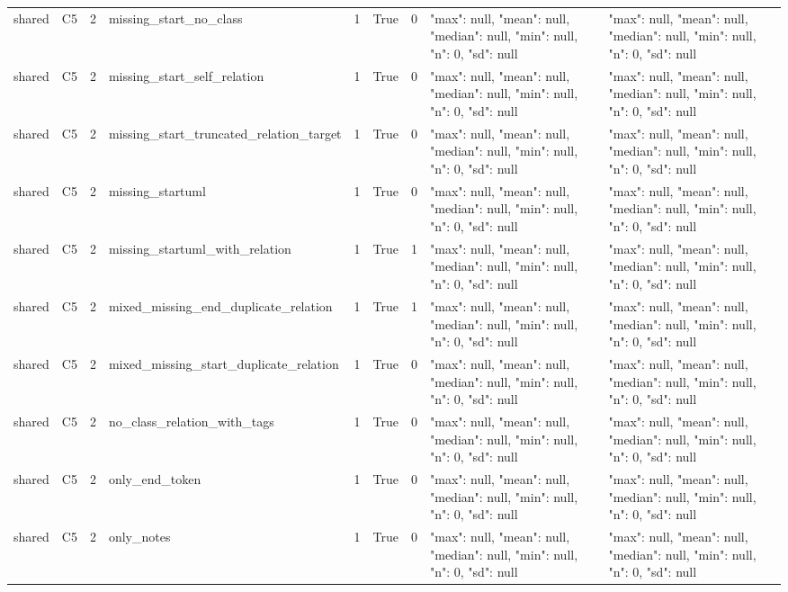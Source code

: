 \begin{tabular}{lllllllll}
shared & C5 & 2 & missing\_start\_no\_class & 1 & True & 0 & {"max": null, "mean": null, "median": null, "min": null, "n": 0, "sd": null} & {"max": null, "mean": null, "median": null, "min": null, "n": 0, "sd": null} \\
shared & C5 & 2 & missing\_start\_self\_relation & 1 & True & 0 & {"max": null, "mean": null, "median": null, "min": null, "n": 0, "sd": null} & {"max": null, "mean": null, "median": null, "min": null, "n": 0, "sd": null} \\
shared & C5 & 2 & missing\_start\_truncated\_relation\_target & 1 & True & 0 & {"max": null, "mean": null, "median": null, "min": null, "n": 0, "sd": null} & {"max": null, "mean": null, "median": null, "min": null, "n": 0, "sd": null} \\
shared & C5 & 2 & missing\_startuml & 1 & True & 0 & {"max": null, "mean": null, "median": null, "min": null, "n": 0, "sd": null} & {"max": null, "mean": null, "median": null, "min": null, "n": 0, "sd": null} \\
shared & C5 & 2 & missing\_startuml\_with\_relation & 1 & True & 1 & {"max": null, "mean": null, "median": null, "min": null, "n": 0, "sd": null} & {"max": null, "mean": null, "median": null, "min": null, "n": 0, "sd": null} \\
shared & C5 & 2 & mixed\_missing\_end\_duplicate\_relation & 1 & True & 1 & {"max": null, "mean": null, "median": null, "min": null, "n": 0, "sd": null} & {"max": null, "mean": null, "median": null, "min": null, "n": 0, "sd": null} \\
shared & C5 & 2 & mixed\_missing\_start\_duplicate\_relation & 1 & True & 0 & {"max": null, "mean": null, "median": null, "min": null, "n": 0, "sd": null} & {"max": null, "mean": null, "median": null, "min": null, "n": 0, "sd": null} \\
shared & C5 & 2 & no\_class\_relation\_with\_tags & 1 & True & 0 & {"max": null, "mean": null, "median": null, "min": null, "n": 0, "sd": null} & {"max": null, "mean": null, "median": null, "min": null, "n": 0, "sd": null} \\
shared & C5 & 2 & only\_end\_token & 1 & True & 0 & {"max": null, "mean": null, "median": null, "min": null, "n": 0, "sd": null} & {"max": null, "mean": null, "median": null, "min": null, "n": 0, "sd": null} \\
shared & C5 & 2 & only\_notes & 1 & True & 0 & {"max": null, "mean": null, "median": null, "min": null, "n": 0, "sd": null} & {"max": null, "mean": null, "median": null, "min": null, "n": 0, "sd": null} \\

\end{tabular}
